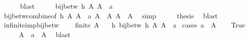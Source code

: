 \begin{isabellebody}
\ \ \ \ \isamarkupfalse%
\ blast\isanewline
\ \ \isamarkupfalse%
\ \isamarkupfalse%
\ {\isachardoublequoteopen}bij{\isacharunderscore}{\kern0pt}betw\ h\ A\ {\isacharparenleft}{\kern0pt}A\ {\isacharminus}{\kern0pt}\ {\isacharbraceleft}{\kern0pt}a{\isacharbraceright}{\kern0pt}{\isacharparenright}{\kern0pt}{\isachardoublequoteclose}\isanewline
\ \ \ \ \isamarkupfalse%
\ bij{\isacharunderscore}{\kern0pt}betw{\isacharunderscore}{\kern0pt}combine{\isacharbrackleft}{\kern0pt}of\ h\ A{\isacharprime}{\kern0pt}\ {\isachardoublequoteopen}A{\isacharprime}{\kern0pt}\ {\isacharminus}{\kern0pt}\ {\isacharbraceleft}{\kern0pt}a{\isacharbraceright}{\kern0pt}{\isachardoublequoteclose}\ {\isachardoublequoteopen}A\ {\isacharminus}{\kern0pt}\ A{\isacharprime}{\kern0pt}{\isachardoublequoteclose}\ {\isachardoublequoteopen}A\ {\isacharminus}{\kern0pt}\ A{\isacharprime}{\kern0pt}{\isachardoublequoteclose}{\isacharbrackright}{\kern0pt}\ \isamarkupfalse%
\ simp\isanewline
\ \ \isamarkupfalse%
\ \isamarkupfalse%
\ {\isacharquery}{\kern0pt}thesis\ \isamarkupfalse%
\ blast\isanewline
{}\isamarkupfalse%
%
\endisatagproof
{\isafoldproof}%
%
\isadelimproof
\isanewline
%
\endisadelimproof
\isanewline
{}\isamarkupfalse%
\ infinite{\isacharunderscore}{\kern0pt}imp{\isacharunderscore}{\kern0pt}bij{\isacharunderscore}{\kern0pt}betw{}{\isacharcolon}{\kern0pt}\isanewline
\ \ \ {\isachardoublequoteopen}{\isasymnot}\ finite\ A{\isachardoublequoteclose}\isanewline
\ \ \ {\isachardoublequoteopen}{\isasymexists}h{\isachardot}{\kern0pt}\ bij{\isacharunderscore}{\kern0pt}betw\ h\ A\ {\isacharparenleft}{\kern0pt}A\ {\isasymunion}\ {\isacharbraceleft}{\kern0pt}a{\isacharbraceright}{\kern0pt}{\isacharparenright}{\kern0pt}{\isachardoublequoteclose}\isanewline
%
\isadelimproof
%
\endisadelimproof
%
\isatagproof
{}\isamarkupfalse%
\ {\isacharparenleft}{\kern0pt}cases\ {\isachardoublequoteopen}a\ {\isasymin}\ A{\isachardoublequoteclose}{\isacharparenright}{\kern0pt}\isanewline
\ \ \isamarkupfalse%
\ True\isanewline
\ \ \isamarkupfalse%
\ \isamarkupfalse%
\ {\isachardoublequoteopen}A\ {\isasymunion}\ {\isacharbraceleft}{\kern0pt}a{\isacharbraceright}{\kern0pt}\ {\isacharequal}{\kern0pt}\ A{\isachardoublequoteclose}\ \isamarkupfalse%
\ blast\isanewline
\ \ \isamarkupfalse%
\ \isamarkupfalse%

\end{isabellebody}
